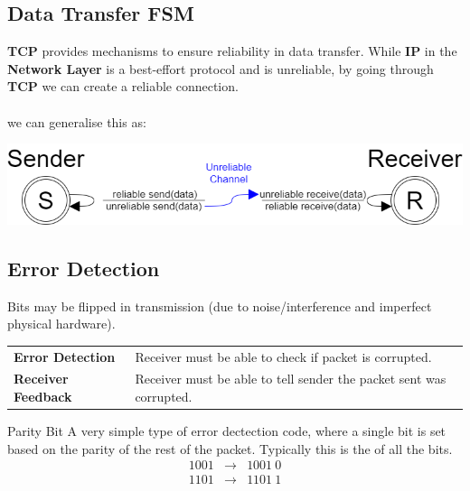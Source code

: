 \subsection{Data Transfer FSM}
\textbf{TCP} provides mechanisms to ensure reliability in data transfer. While \textbf{IP} in the \textbf{Network Layer} is a best-effort protocol and is unreliable, by going through \textbf{TCP} we can create a reliable connection.
\\
\\ we can generalise this as:
\begin{center}\includegraphics[width=\textwidth]{transport_layer/images/data transfer fsm.png}\end{center}

\subsection{Error Detection}
Bits may be flipped in transmission (due to noise/interference and imperfect physical hardware).
\begin{center}
    \begin{tabular}{l p{}}
        \textbf{Error Detection}   & Receiver must be able to check if packet is corrupted.              \\
        \textbf{Receiver Feedback} & Receiver must be able to tell sender the packet sent was corrupted. \\
    \end{tabular}
\end{center}

\begin{definitionbox}{Parity Bit}
    A very simple type of error dectection code, where a single bit is set based on the parity of the rest of the packet. Typically this is the  of all the bits.
    \[\begin{matrix}
            1001 & \to & 1001 \ 0 \\
            1101 & \to & 1101 \ 1 \\
        \end{matrix}\]
\end{definitionbox}

